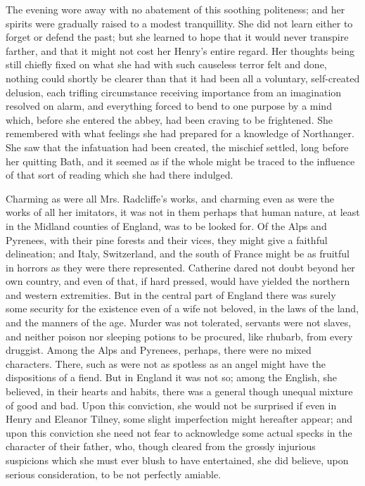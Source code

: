 The evening wore away with no abatement of this soothing politeness; and her spirits were gradually raised to a modest tranquillity. She did not learn either to forget or defend the past; but she learned to hope that it would never transpire farther, and that it might not cost her Henry's entire regard. Her thoughts being still chiefly fixed on what she had with such causeless terror felt and done, nothing could shortly be clearer than that it had been all a voluntary, self-created delusion, each trifling circumstance receiving importance from an imagination resolved on alarm, and everything forced to bend to one purpose by a mind which, before she entered the abbey, had been craving to be frightened. She remembered with what feelings she had prepared for a knowledge of Northanger. She saw that the infatuation had been created, the mischief settled, long before her quitting Bath, and it seemed as if the whole might be traced to the influence of that sort of reading which she had there indulged.

Charming as were all Mrs. Radcliffe's works, and charming even as were the works of all her imitators, it was not in them perhaps that human nature, at least in the Midland counties of England, was to be looked for. Of the Alps and Pyrenees, with their pine forests and their vices, they might give a faithful delineation; and Italy, Switzerland, and the south of France might be as fruitful in horrors as they were there represented. Catherine dared not doubt beyond her own country, and even of that, if hard pressed, would have yielded the northern and western extremities. But in the central part of England there was surely some security for the existence even of a wife not beloved, in the laws of the land, and the manners of the age. Murder was not tolerated, servants were not slaves, and neither poison nor sleeping potions to be procured, like rhubarb, from every druggist. Among the Alps and Pyrenees, perhaps, there were no mixed characters. There, such as were not as spotless as an angel might have the dispositions of a fiend. But in England it was not so; among the English, she believed, in their hearts and habits, there was a general though unequal mixture of good and bad. Upon this conviction, she would not be surprised if even in Henry and Eleanor Tilney, some slight imperfection might hereafter appear; and upon this conviction she need not fear to acknowledge some actual specks in the character of their father, who, though cleared from the grossly injurious suspicions which she must ever blush to have entertained, she did believe, upon serious consideration, to be not perfectly amiable.

